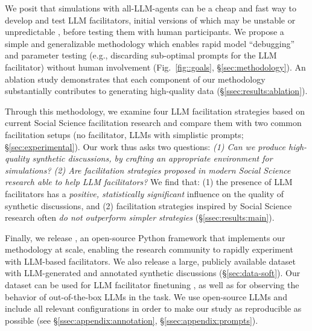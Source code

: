 We posit that simulations with all-\ac{LLM}-agents can be a cheap and fast way to develop and test  \ac{LLM} facilitators, initial versions of which may be unstable or unpredictable \cite{atil_2025, rossi_2024}, before testing them with human participants. We propose a simple and generalizable methodology which enables rapid model “debugging” and parameter testing (e.g., discarding sub-optimal  prompts for the \ac{LLM} facilitator) without human involvement (Fig.~\ref{fig::goals}, \S\ref{sec:methodology}). An ablation study demonstrates that each component of our methodology substantially contributes to generating high-quality data (\S\ref{ssec:results:ablation}). 

Through this methodology, we examine  four \ac{LLM} facilitation strategies based on current Social Science facilitation research and compare them with two common facilitation setups (no facilitator, \acp{LLM} with simplistic prompts; \S\ref{sec:experimental}). Our work thus asks two questions: \emph{(1) Can we produce high-quality synthetic discussions, by crafting an appropriate environment for simulations? (2) Are facilitation strategies proposed in modern Social Science research able to help \ac{LLM} facilitators?} We find that: (1) the presence of \ac{LLM} facilitators has a \emph{positive, statistically significant} influence on the quality of synthetic discussions, and (2) facilitation strategies inspired by Social Science research often \emph{do not outperform simpler strategies} (\S\ref{ssec:results:main}).

Finally, we release \syndisco, an open-source Python framework that implements our methodology at scale, enabling the research community to rapidly experiment with \ac{LLM}-based facilitators. We also release \vmd a large, publicly available dataset with \ac{LLM}-generated and annotated synthetic discussions (\S\ref{sec:data-soft}). Our dataset can be used for \ac{LLM} facilitator finetuning \cite{ulmer2024}, as well as for observing the behavior of out-of-the-box \acp{LLM} in the task. We use open-source \acp{LLM} and include all relevant configurations in order to make our study as reproducible as possible (see \S\ref{ssec:appendix:annotation}, \S\ref{ssec:appendix:prompts}).
